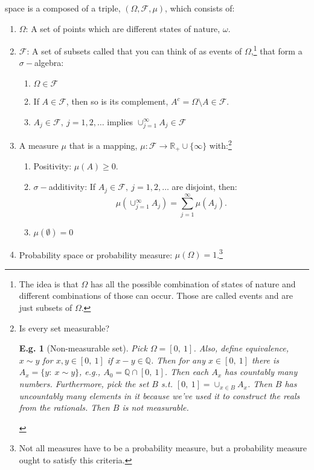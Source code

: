 \documentclass{tufte-book}
\theoremstyle{mytheoremstyle}
\theoremstyle{mylemstyle}
\theoremstyle{mydefstyle}
\newtheorem*{ex}{E.g.}
\begin{document}
 space is a composed of a triple, \((\Omega, \mathcal{F}, \mu)\), which consists of:
	\begin{enumerate}
		\item \(\Omega\): A set of points which are different states of nature, \(\omega\).
		\item \(\mathcal{F}\): A set of subsets called that you can think of as events of \(\Omega\),\footnote{The idea is that \(\Omega\) has all the possible combination of states of nature and different combinations of those can occur. Those are called events and are just subsets of \(\Omega\).} that form a \(\sigma-\)algebra:
			\begin{enumerate}
				\item \(\Omega \in \mathcal{F}\)
				\item If \(A \in \mathcal{F}\), then so is its complement, \(A^c = \Omega \setminus A \in \mathcal{F}\).
				\item \(A_j \in \mathcal{F},\ j = 1,2,\dots\) implies \(\cup_{j=1}^\infty A_j \in \mathcal{F}\)
			\end{enumerate}
		\item A measure \(\mu\) that is a mapping, \(\mu:\mathcal{F} \rightarrow \mathbb{R}_{+} \cup \{\infty\}\) with:\footnote{Is every set measurable? \begin{ex}[Non-measurable set] Pick \(\Omega = [0,\ 1]\). Also, define equivalence, \(x\sim y\) for \(x, y\in[0,\ 1]\) if \(x-y \in \mathbb{Q}\). Then for any \(x \in [0,\ 1]\) there is \(A_x = \{y:\ x \sim y\}\), e.g., \(A_0 = \mathbb{Q} \cap [0,\ 1]\). Then each \(A_x\) has countably many numbers. Furthermore, pick the set \(B\) s.t. \([0,\ 1] = \cup_{x\in B} A_x\). Then \(B\) has uncountably many elements in it because we've used it to construct the reals from the rationals. Then \(B\) is not measurable. \end{ex}}
			\begin{enumerate}
				\item Positivity: \(\mu(A) \ge 0\).
				\item \(\sigma-\)additivity: If \(A_j \in \mathcal{F},\ j=1,2,\dots\) are disjoint, then:
					\[\mu\left(\cup_{j=1}^\infty A_j\right) = \sum_{j=1}^\infty \mu(A_j) \text{.}\]
				\item \(\mu(\emptyset) = 0\)
			\end{enumerate}
		\item Probability space or probability measure: \(\mu(\Omega) = 1\).\footnote{Not all measures have to be a probability measure, but a probability measure ought to satisfy this criteria.}
	\end{enumerate}
\end{document}
